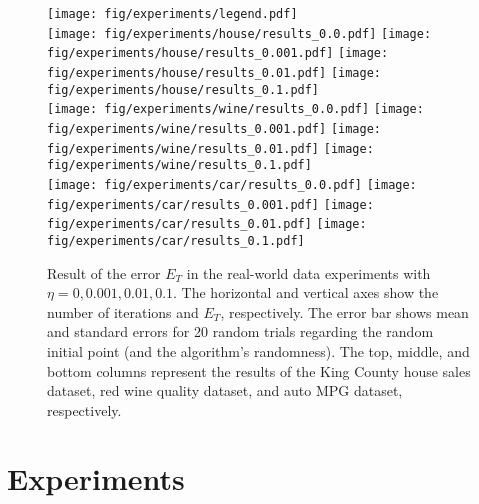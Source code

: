 \begin{figure*}[t]
    \centering
    \texttt{[image: fig/experiments/legend.pdf]}\\
    \texttt{[image: fig/experiments/house/results\_0.0.pdf]}
    \texttt{[image: fig/experiments/house/results\_0.001.pdf]}
    \texttt{[image: fig/experiments/house/results\_0.01.pdf]}
    \texttt{[image: fig/experiments/house/results\_0.1.pdf]}\\
    \texttt{[image: fig/experiments/wine/results\_0.0.pdf]}
    \texttt{[image: fig/experiments/wine/results\_0.001.pdf]}
    \texttt{[image: fig/experiments/wine/results\_0.01.pdf]}
    \texttt{[image: fig/experiments/wine/results\_0.1.pdf]}\\
    \texttt{[image: fig/experiments/car/results\_0.0.pdf]}
    \texttt{[image: fig/experiments/car/results\_0.001.pdf]}
    \texttt{[image: fig/experiments/car/results\_0.01.pdf]}
    \texttt{[image: fig/experiments/car/results\_0.1.pdf]}    
    \caption{
        Result of the error $E_T$ in the real-world data experiments with $\eta=0, 0.001, 0.01, 0.1$.
        The horizontal and vertical axes show the number of iterations and $E_T$, respectively.
        The error bar shows mean and standard errors for 20 random trials regarding the random initial point (and the algorithm's randomness).
        The top, middle, and bottom columns represent the results of the King County house sales dataset, red wine quality dataset, and auto MPG dataset, respectively.
    }
    \label{fig:real_results}
\end{figure*}


\section{Experiments}
\label{sec:experiment}

